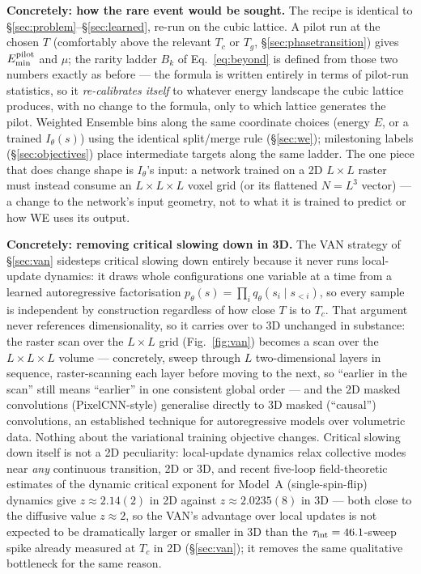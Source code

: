 \documentclass[11pt,a4paper]{article}
\begin{document}
\textbf{Concretely: how the rare event would be sought.} The recipe is identical to
\S\ref{sec:problem}--\S\ref{sec:learned}, re-run on the cubic lattice. A pilot run at the chosen
$T$ (comfortably above the relevant $T_c$ or $T_g$, \S\ref{sec:phasetransition}) gives
$E^{\rm pilot}_{\min}$ and $\mu$; the rarity ladder $B_k$ of Eq.~\eqref{eq:beyond} is defined from
those two numbers exactly as before --- the formula is written entirely in terms of pilot-run
statistics, so it \emph{re-calibrates itself} to whatever energy landscape the cubic lattice
produces, with no change to the formula, only to which lattice generates the pilot. Weighted
Ensemble bins along the same coordinate choices (energy $E$, or a trained $I_\theta(s)$) using the
identical split/merge rule (\S\ref{sec:we}); milestoning labels (\S\ref{sec:objectives}) place
intermediate targets along the same ladder. The one piece that does change shape is $I_\theta$'s
input: a network trained on a 2D $L\times L$ raster must instead consume an $L\times L\times L$
voxel grid (or its flattened $N=L^3$ vector) --- a change to the network's input geometry, not to
what it is trained to predict or how WE uses its output.

\textbf{Concretely: removing critical slowing down in 3D.} The VAN strategy of \S\ref{sec:van}
sidesteps critical slowing down entirely because it never runs local-update dynamics: it draws
whole configurations one variable at a time from a learned autoregressive factorisation
$p_\theta(s)=\prod_i q_\theta(s_i\mid s_{<i})$, so every sample is independent by construction
regardless of how close $T$ is to $T_c$. That argument never references dimensionality, so it
carries over to 3D unchanged in substance: the raster scan over the $L\times L$ grid
(Fig.~\ref{fig:van}) becomes a scan over the $L\times L\times L$ volume --- concretely, sweep
through $L$ two-dimensional layers in sequence, raster-scanning each layer before moving to the
next, so ``earlier in the scan'' still means ``earlier'' in one consistent global order --- and
the 2D masked convolutions (PixelCNN-style) generalise directly to 3D masked (``causal'')
convolutions, an established technique for autoregressive models over volumetric data. Nothing
about the variational training objective changes. Critical slowing down itself is not a 2D
peculiarity: local-update dynamics relax collective modes near \emph{any} continuous transition,
2D or 3D, and recent five-loop field-theoretic estimates of the dynamic critical exponent for
Model~A (single-spin-flip) dynamics give $z\approx2.14(2)$ in 2D against $z\approx2.0235(8)$ in 3D
\cite{adzhemyan2022} --- both close to the diffusive value $z\approx2$, so the VAN's advantage
over local updates is not expected to be dramatically larger or smaller in 3D than the
$\tau_{\rm int}=46.1$-sweep spike already measured at $T_c$ in 2D (\S\ref{sec:van}); it removes
the same qualitative bottleneck for the same reason.
\end{document}
